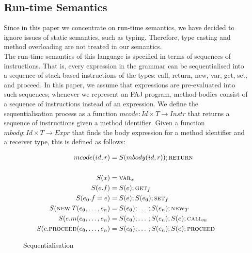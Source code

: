 \subsection{Run-time Semantics}
\label{sec:rt}

Since in this paper we concentrate on run-time semantics, we have decided to ignore issues of static semantics, such as typing. Therefore, type casting and method overloading are not treated in our semantics.\\
The run-time semantics of this language is specified in terms of sequences of instructions. That is, every expression in the grammar can be sequentialised into a sequence of stack-based instructions of the types: {\sc call}, {\sc return}, {\sc new}, {\sc var}, {\sc get}, {\sc set}, and {\sc proceed}. In this paper, we assume that expressions are pre-evaluated into such sequences; whenever we represent an FAJ program, method-bodies consist of a sequence of instructions instead of an expression. We define the sequentialisation process as a function $mcode : Id \times T \rightarrow \overline{Instr}$ that returns a sequence of instructions given a method identifier. Given a function $mbody: Id \times T \rightarrow Expr$ that finds the body expression for a method identifier and a receiver type, this is defined as follows:

\begin{figure}[ht]
\begin{align*}
mcode(id, r)& = S(mbody(id, r));\text{\sc{return}}\\
\\
S(x)&=\text{\sc{var}}_x\\
S(e.f)&=S(e);\text{\sc{get}}_f\\
S(e_0.f=e)&=S(e);S(e_0);\text{\sc{set}}_f\\
S(\text{\sc new} \: T(e_0,\dotsc,e_n)&=S(e_0);\dotsc;S(e_n);\text{\sc{new}}_T\\
S(e.m(e_0,\dotsc,e_n)&=S(e_0);\dotsc;S(e_n);S(e);\text{\sc{call}}_m\\
S(e.\text{\sc proceed}(e_0,\dotsc,e_n)&=S(e_0);\dotsc;S(e_n);S(e);\text{\sc{proceed}}\\
\end{align*}
\caption{Sequentialisation}
\label{fig:fja_restack}
\end{figure}

